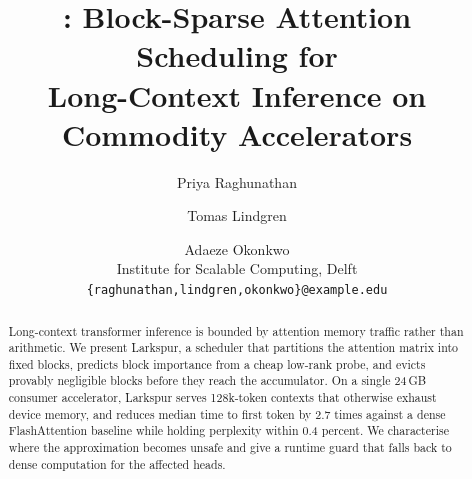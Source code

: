 \documentclass[10pt,twocolumn]{article}
\title{\bfseries \sysname: Block-Sparse Attention Scheduling for\\
Long-Context Inference on Commodity Accelerators}
\author{
  Priya Raghunathan \and Tomas Lindgren \and Adaeze Okonkwo\\
  \normalsize Institute for Scalable Computing, Delft\\
  \normalsize \texttt{\{raghunathan,lindgren,okonkwo\}@example.edu}
}
\date{}
\newcommand{\sysname}{Larkspur}
\begin{document}
\maketitle

\begin{abstract}
Long-context transformer inference is bounded by attention memory traffic
rather than arithmetic. We present \sysname, a scheduler that partitions the
attention matrix into fixed blocks, predicts block importance from a cheap
low-rank probe, and evicts provably negligible blocks before they reach the
accumulator. On a single 24\,GB consumer accelerator, \sysname{} serves
128k-token contexts that otherwise exhaust device memory, and reduces median
time to first token by 2.7 times against a dense FlashAttention baseline while
holding perplexity within 0.4 percent. We characterise where the approximation
becomes unsafe and give a runtime guard that falls back to dense computation
for the affected heads.
\end{abstract}








\balance


\end{document}
